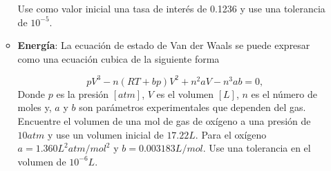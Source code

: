 \documentclass[12pt]{article}
\begin{document}
\begin{enumerate}[leftmargin=*,widest=9]
\begin{itemize}
Use como valor inicial una tasa de interés de 0.1236 y use una tolerancia de \(10^{-5}\).

\item \textbf{Energía}: La ecuación de estado de Van der Waals se puede expresar como una ecuación cubica de la siguiente forma

\begin{equation}
pV^3-n(RT + bp)V^2 + n^2aV - n^3ab = 0,
\end{equation}
Donde \(p\) es la presión \([atm]\), \(V\) es el volumen \([L]\), \(n\) es el número de moles y, \(a\) y \(b\) son parámetros experimentales que dependen del gas. Encuentre el volumen de una mol de gas de oxígeno a una presión de \(10atm\) y use un volumen inicial de \(17.22L\). Para el oxígeno \(a= 1.360L^2 atm / mol^2\) y \(b= 0.003183L/mol\). Use una tolerancia en el volumen de \(10^{-6}L\).
    \end{itemize}


  \end{enumerate}
\end{document}
